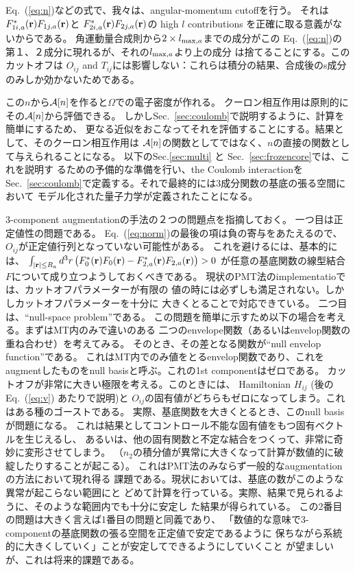 \documentclass[twocolumn,showpacs,preprintnumbers,amsmath,amssymb,floatfix]{revtex4-1}
\newcommand{\bfr}{{\bf r}}
\def\calR{{\cal A}}
\newcommand{\req}[1]{\mbox{Eq.~\!(\ref{#1})}}
\newcommand{\refsec}[1]{\mbox{Sec.~\!\ref{#1}}}
\def\intaa{\int_{|\bfr|\leq R_a}}
\def\rhoij{\rho_{ij}}
\def\intaa{\int_{|\bfr|\leq R_a}}
\def\rhoij{\rho_{ij}}
\begin{document}
\req{eq:n}などの式で、我々は、angular-momentum cutoffを行う。
それは$F^*_{1i,a}(\bfr) F_{1j,a}(\bfr)$と
$F^*_{2i,a}(\bfr) F_{2j,a}(\bfr)$の high $l$ contributions
を正確に取る意義がないからである。
角運動量合成則から$2\times l_{{\rm max},a}$までの成分がこの
\req{eq:n}の第１、２成分に現れるが、それの$l_{{\rm max},a}$より上の成分
は捨てることにする。このカットオフは
$O_{ij}$ and $T_{ij}$には影響しない：これらは積分の結果、合成後のs成分
のみしか効かないためである。

この$n$から$\calR[n]$を作ると$\Omega$での電子密度が作れる。
クーロン相互作用は原則的にその$\calR[n]$から評価できる。
しかし\refsec{sec:coulomb}で説明するように、計算を簡単にするため、
更なる近似をおこなってそれを評価することにする。結果として、そのクーロン相互作用は
$\calR[n]$の関数としてではなく、$n$の直接の関数として与えられることになる。
以下のSec.\ref{sec:multi} と \refsec{sec:frozencore}では、これを説明す
るための予備的な準備を行い、the Coulomb interactionを
\refsec{sec:coulomb}で定義する。それで最終的には3成分関数の基底の張る空間において
モデル化された量子力学が定義されたことになる。

3-component augmentationの手法の２つの問題点を指摘しておく。
一つ目は正定値性の問題である。
\req{eq:norm}の最後の項は負の寄与をあたえるので、
$O_{ij}$が正定値行列となっていない可能性がある。
これを避けるには、基本的には、
$\intaa d^3r \left(F^*_{0}(\bfr)F_{0}(\bfr)-F^*_{2,a}(\bfr)F_{2,a}(\bfr)\right)>0$ 
が任意の基底関数の線型結合$F$について成り立つようしておくべきである。
現状のPMT法のimplementatioでは、カットオフパラメーターが有限の
値の時には必ずしも満足されない。しかしカットオフパラメーターを十分に
大きくとることで対応できている。
二つ目は、``null-space problem''である。
この問題を簡単に示すため以下の場合を考える。まずはMT内のみで違いのある
二つのenvelope関数（あるいはenvelop関数の重ね合わせ）を考えてみる。
そのとき、その差となる関数が``null envelop function''である。
これはMT内でのみ値をとるenvelop関数であり、これをaugmentしたものをnull
basisと呼ぶ。これの1st componentはゼロである。
カットオフが非常に大きい極限を考える。このときには、
Hamiltonian $H_{ij}$ (後の\req{eq:v} あたりで説明)と 
$O_{ij}$の固有値がどちらもゼロになってしまう。これはある種のゴーストである。
実際、基底関数を大きくとるとき、このnull basisが問題になる。
これは結果としてコントロール不能な固有値をもつ固有ベクトルを生じえるし、
あるいは、他の固有関数と不定な結合をつくって、非常に奇妙に変形させてしまう。
（$n_2$の積分値が異常に大きくなって計算が数値的に破綻したりすることが起こる）。
これはPMT法のみならず一般的なaugmentationの方法において現れ得る
課題である。現状においては、基底の数がこのような異常が起こらない範囲にと
どめて計算を行っている。実際、結果で見られるように、そのような範囲内でも十分に安定し
た結果が得られている。
この2番目の問題は大きく言えば1番目の問題と同義であり、
「数値的な意味で3-componentの基底関数の張る空間を正定値で安定であるように
保ちながら系統的に大きくしていく」ことが安定してできるようにしていくこと
が望ましいが、これは将来的課題である。
\end{document}
